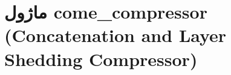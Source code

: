 \section{ماژول come\_compressor (Concatenation and Layer Shedding Compressor)}
\label{sec:module_come_compressor}
